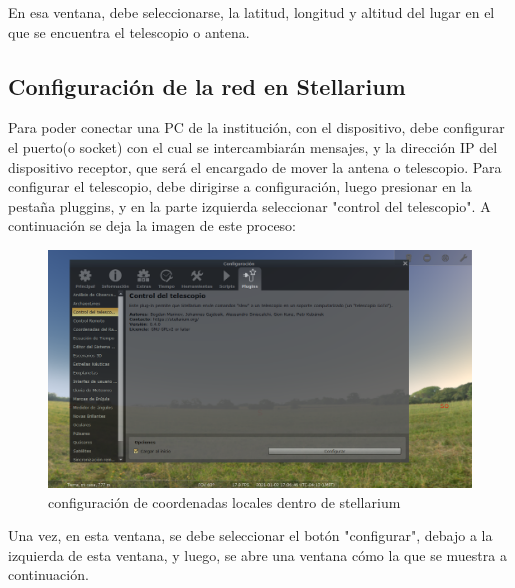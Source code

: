 En esa ventana, debe seleccionarse, la latitud, longitud y altitud del lugar en el que se encuentra el telescopio o antena. 

\subsection{Configuración de la red en Stellarium} \label{sub:conf_stellarium_red}


Para poder conectar una PC de la institución, con el dispositivo, debe configurar el puerto(o socket) con el cual se intercambiarán mensajes, y la dirección IP del dispositivo receptor, que será el encargado de mover la antena o telescopio. Para configurar el telescopio, debe dirigirse a configuración, luego presionar en la pestaña pluggins, y en la parte izquierda seleccionar "control del telescopio". A continuación se deja la imagen de este proceso: 
 
\begin{figure}[h]
	\includegraphics[width=\textwidth]{conf_tel_red1} 
	\caption{configuración de coordenadas locales dentro de stellarium} 
	\label{fig:stell_conf_red}
\end{figure}

Una vez, en esta ventana, se debe seleccionar el botón "configurar", debajo a la izquierda de esta ventana, y luego, se abre una ventana cómo la que se muestra a continuación. 


